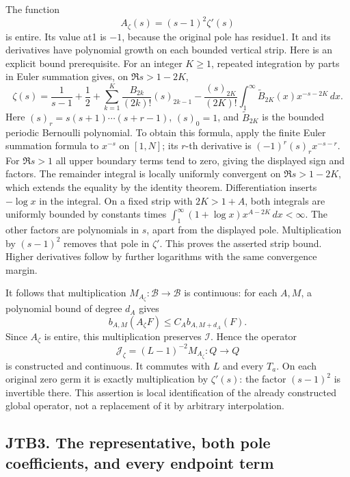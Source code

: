 The function \[
A_\zeta(s)=(s-1)^2\zeta'(s)
\tag{JTB2.1}
\] is entire. Its value at1 is \(-1\), because the original pole has
residue1. It and its derivatives have polynomial growth on each bounded
vertical strip. Here is an explicit bound prerequisite. For an integer
\(K\ge1\), repeated integration by parts in Euler summation gives, on
\(\Re s>1-2K\), \[
\zeta(s)=\frac1{s-1}+\frac12+
\sum_{k=1}^{K}\frac{B_{2k}}{(2k)!}(s)_{2k-1}
-\frac{(s)_{2K}}{(2K)!}
\int_1^\infty\widetilde B_{2K}(x)x^{-s-2K}\,dx.
\tag{JTB2.2}
\] Here \((s)_r=s(s+1)\cdots(s+r-1)\), \((s)_0=1\), and
\(\widetilde B_{2K}\) is the bounded periodic Bernoulli polynomial. To
obtain this formula, apply the finite Euler summation formula to
\(x^{-s}\) on \([1,N]\); its \(r\)-th derivative is
\((-1)^r(s)_rx^{-s-r}\). For \(\Re s>1\) all upper boundary terms tend
to zero, giving the displayed sign and factors. The remainder integral
is locally uniformly convergent on \(\Re s>1-2K\), which extends the
equality by the identity theorem. Differentiation inserts \(-\log x\) in
the integral. On a fixed strip with \(2K>1+A\), both integrals are
uniformly bounded by constants times
\(\int_1^\infty(1+\log x)x^{A-2K}\,dx<\infty\). The other factors are
polynomials in \(s\), apart from the displayed pole. Multiplication by
\((s-1)^2\) removes that pole in \(\zeta'\). This proves the asserted
strip bound. Higher derivatives follow by further logarithms with the
same convergence margin.

It follows that multiplication \(M_{A_\zeta}:\mathcal B\to\mathcal B\)
is continuous: for each \(A,M\), a polynomial bound of degree \(d_A\)
gives \[
b_{A,M}(A_\zeta F)\le C_A b_{A,M+d_A}(F).
\tag{JTB2.3}
\] Since \(A_\zeta\) is entire, this multiplication preserves
\(\mathcal I\). Hence the operator \[
\boxed{\mathcal J_\zeta=(L-1)^{-2}M_{A_\zeta}:Q\longrightarrow Q}
\tag{JTB2.4}
\] is constructed and continuous. It commutes with \(L\) and every
\(T_a\). On each original zero germ it is exactly multiplication by
\(\zeta'(s)\): the factor \((s-1)^2\) is invertible there. This
assertion is local identification of the already constructed global
operator, not a replacement of it by arbitrary interpolation.

\subsection{JTB3. The representative, both pole coefficients, and every
endpoint
term}\label{jtb3.-the-representative-both-pole-coefficients-and-every-endpoint-term}

